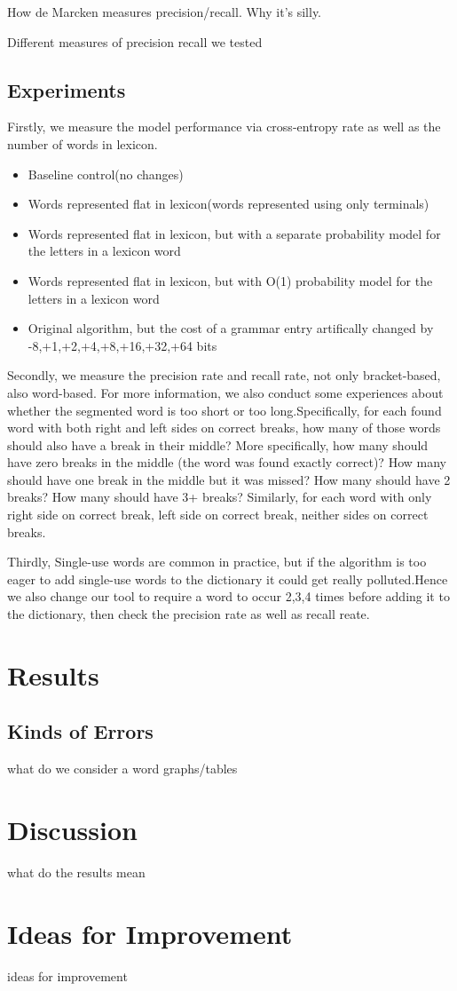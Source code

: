 \documentclass[11pt, oneside, fleqn]{article}
\begin{document}
	How de Marcken measures precision/recall. Why it's silly.

	Different measures of precision recall we tested

  \subsection*{Experiments}
  
  Firstly, we measure the model performance via cross-entropy rate as well as the number of words in lexicon. 
  \begin{itemize}
    \item Baseline control(no changes)
    \item Words represented flat in lexicon(words represented using only terminals)
    \item Words represented flat in lexicon, but with a separate probability model for the letters in a lexicon word
    \item Words represented flat in lexicon, but with O(1) probability model for the letters in a lexicon word
    \item Original algorithm, but the cost of a grammar entry artifically changed by -8,+1,+2,+4,+8,+16,+32,+64 bits
   \end{itemize}

    Secondly, we measure the precision rate and recall rate, not only bracket-based, also word-based. 
    For more information, we also conduct some experiences about whether the segmented word is too short or too long.Specifically, for each found word with both right and left sides on correct breaks, how many of those words should also have a break in their middle? More specifically, how many should have zero breaks in the middle (the word was found exactly correct)? How many should have one break in the middle but it was missed? How many should have 2 breaks? How many should have 3+ breaks? Similarly, for each word with only right side on correct break, left side on correct break, neither sides on correct breaks. 
   
    Thirdly, Single-use words are common in practice, but if the algorithm is too eager to add single-use words to the dictionary it could get really polluted.Hence we also change our tool to require a word to occur 2,3,4 times before adding it to the dictionary, then check the precision rate as well as recall reate. 
 
   \section*{Results}
   
   \subsection*{Kinds of Errors}

  what do we consider a word
  graphs/tables
  
  \section*{Discussion}

  what do the results mean

  \section*{Ideas for Improvement}

  ideas for improvement
\end{document}
